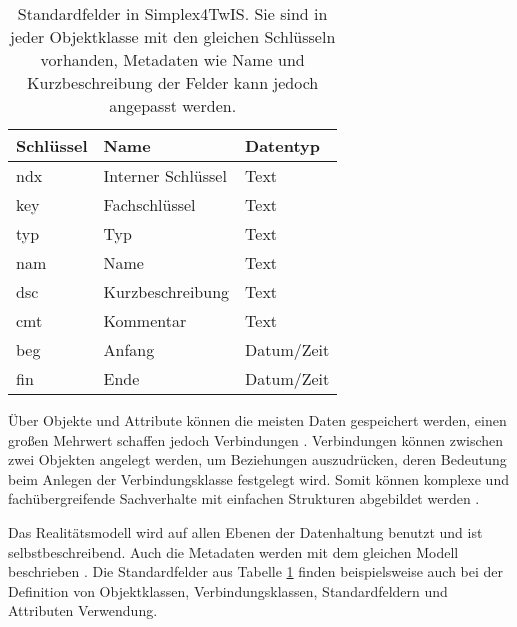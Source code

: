 \begin{table}[!ht]
  \centering
  \begin{tabular}{|| l | l | l ||}
    \hline
    Schlüssel & Name               & Datentyp   \\[0.5ex]
    \hline\hline
    ndx       & Interner Schlüssel & Text       \\
    key       & Fachschlüssel      & Text       \\
    typ       & Typ                & Text       \\
    nam       & Name               & Text       \\
    dsc       & Kurzbeschreibung   & Text       \\
    cmt       & Kommentar          & Text       \\
    beg       & Anfang             & Datum/Zeit \\
    fin       & Ende               & Datum/Zeit \\
    \hline
  \end{tabular}
  \caption[Standardfelder in Simplex4TwIS]{Standardfelder in Simplex4TwIS. Sie sind in jeder Objektklasse mit den gleichen Schlüsseln vorhanden, Metadaten wie Name und Kurzbeschreibung der Felder kann jedoch angepasst werden.\\\parencite{simplex4datagmbhSimplex4TwIS}}
  \label{tab:s4d-fields}
\end{table}

Über Objekte und Attribute können die meisten Daten gespeichert werden, einen großen Mehrwert schaffen jedoch Verbindungen \parencite{rudolfUmweltdatenIntelligenz2021}. Verbindungen können zwischen zwei Objekten angelegt werden, um Beziehungen auszudrücken, deren Bedeutung beim Anlegen der Verbindungsklasse festgelegt wird. Somit können komplexe und fachübergreifende Sachverhalte mit einfachen Strukturen abgebildet werden \parencite{grossmannFachsystemeSchemaevolution2024}.

\pskip
Das Realitätsmodell wird auf allen Ebenen der Datenhaltung benutzt und ist selbstbeschreibend. Auch die Metadaten werden mit dem gleichen Modell beschrieben \parencite{grossmannFachsystemeSchemaevolution2024}. Die Standardfelder aus Tabelle \ref{tab:s4d-fields} finden beispielsweise auch bei der Definition von Objektklassen, Verbindungsklassen, Standardfeldern und Attributen Verwendung.
